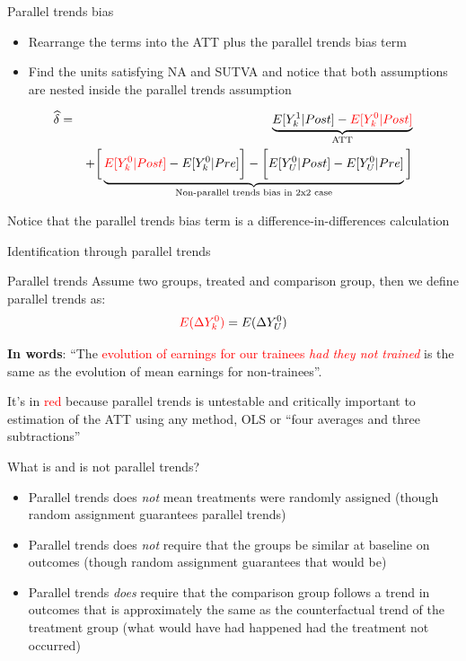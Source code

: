 \documentclass{beamer}
\begin{document}
\begin{frame}{Parallel trends bias}

\begin{itemize}
\item Rearrange the terms into the ATT plus the parallel trends bias term
\item Find the units satisfying NA and SUTVA and notice that both assumptions are nested inside the parallel trends assumption
\end{itemize}

\begin{eqnarray*}
\widehat{\delta} &=& \underbrace{E[Y^1_k | Post] - \textcolor{red}{E[Y^0_k | Post]}}_{\mathclap{\text{ATT}}} \\
&& + \bigg [  \underbrace{\textcolor{red}{E[Y^0_k | Post]} - E[Y^0_k | Pre] \bigg ] - \bigg [ E[Y^0_U | Post] - E[Y_U^0 | Pre] }_{\mathclap{\text{Non-parallel trends bias in 2x2 case}}} \bigg ]
\end{eqnarray*}

Notice that the parallel trends bias term is a difference-in-differences calculation


\end{frame}

\begin{frame}{Identification through parallel trends}
	

	\begin{block}{Parallel trends}
	Assume two groups, treated and comparison group, then we define parallel trends as:	 $$\textcolor{red}{E(}\textcolor{red}{\Delta Y^0_k)} = E(\Delta Y^0_U)$$
	\end{block}

\textbf{In words}: ``The \textcolor{red}{evolution of earnings for our trainees \emph{had they not trained}} is the same as the evolution of mean earnings for non-trainees''.  

\bigskip

It's in \textcolor{red}{red} because parallel trends is untestable and critically important to estimation of the ATT using any method, OLS or ``four averages and three subtractions''

	

	
\end{frame}


\begin{frame}{What is and is not parallel trends?}

\begin{itemize}
\item Parallel trends does \emph{not} mean treatments were randomly assigned (though random assignment guarantees parallel trends)
\item Parallel trends does \emph{not} require that the groups be similar at baseline on outcomes (though random assignment guarantees that would be)
\item Parallel trends \emph{does} require that the comparison group follows a trend in outcomes that is approximately the same as the counterfactual trend of the treatment group (what would have had happened had the treatment not occurred)
\end{itemize}

\end{frame}
\end{document}
